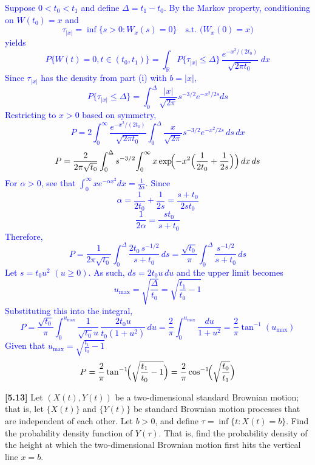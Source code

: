 \documentclass{article}
\begin{document}
\begin{enumerate}
        \textcolor{blue}{
Suppose $0<t_0<t_1$ and define $\Delta=t_1-t_0$. By the Markov property, conditioning on $W(t_0)=x$ and 
$$
\tau_{|x|}=\inf\{s>0:W_{x}(s)=0\}\quad\text{s.t. }\bigl(W_{x}(0)=x\bigr)
$$
yields
$$
P\{W(t)=0, t\in(t_0,t_1)\}
  =\int_{\mathbb R}P\{\tau_{|x|}\le\Delta\}\,
           \frac{e^{-x^{2}/(2t_0)}}{\sqrt{2\pi t_0}}\;dx
$$
Since $\tau_{|x|}$ has the density from part (i) with $b=|x|$,
$$
P\{\tau_{|x|}\le\Delta\}=\int_{0}^{\Delta}\frac{|x|}{\sqrt{2\pi}}s^{-3/2}
e^{-x^{2}/2s}ds
$$
Restricting to $x>0$ based on symmetry,
$$
P = 2\int_{0}^{\infty}\frac{e^{-x^{2}/(2t_0)}}{\sqrt{2\pi t_0}}
         \int_{0}^{\Delta}\frac{x}{\sqrt{2\pi}}s^{-3/2}
               e^{-x^{2}/2s}\,ds\,dx
$$
$$
P=\frac{2}{2\pi\sqrt{t_0}}
    \int_{0}^{\Delta}s^{-3/2}\!
      \int_{0}^{\infty}x\exp\!\Bigl(-x^{2}\Bigl(\frac1{2t_0}+\frac1{2s}\Bigr)\Bigr)\,dx\,ds
$$
For $\alpha>0$, see that $\int_{0}^{\infty}x e^{-\alpha x^{2}}dx=\frac1{2\alpha}$.
Since
$$
\alpha=\frac1{2t_0}+\frac1{2s}=\frac{s+t_0}{2st_0}
$$
$$
\frac1{2\alpha}=\frac{st_0}{s+t_0}
$$
Therefore,  
$$
P=\frac1{2\pi\sqrt{t_0}}
      \int_{0}^{\Delta}\frac{2t_0\,s^{-1/2}}{s+t_0}\,ds
  =\frac{\sqrt{t_0}}{\pi}\int_{0}^{\Delta}\!\frac{s^{-1/2}}{s+t_0}\,ds 
$$
Let $s=t_0u^{2}$ $(u\ge0)$. As such, $ds=2t_0u\,du$ and the upper limit becomes  
$$
u_{\max}=\sqrt{\frac{\Delta}{t_0}}=\sqrt{\frac{t_1}{t_0}-1}
$$
Substituting this into the integral,
$$
P=\frac{\sqrt{t_0}}{\pi}\int_{0}^{u_{\max}}
       \frac{1}{\sqrt{t_0}u}\,\frac{2t_0u}{t_0(1+u^{2})}\,du
  =\frac{2}{\pi}\int_{0}^{u_{\max}}\frac{du}{1+u^{2}}
  =\frac{2}{\pi}\tan^{-1}(u_{\max})
$$
Given that 
$
u_{\max}=\sqrt{\frac{t_1}{t_0}-1}$
$$
P=\frac{2}{\pi}\tan^{-1}\!\Bigl(\sqrt{\frac{t_1}{t_0}-1}\Bigr)
  =\frac{2}{\pi}\cos^{-1}\!\Bigl(\sqrt{\frac{t_0}{t_1}}\Bigr)
$$
        }

\end{enumerate}



\textbf{[5.13]} Let $(X(t), Y(t))$ be a two-dimensional standard Brownian motion; that is, let $\{X(t)\}$ and $\{Y(t)\}$ be standard Brownian motion processes that are independent of each other. Let $b > 0$, and define $\tau = \inf\{t : X(t) = b\}$. Find the probability density function of $Y(\tau)$. That is, find the probability density of the height at which the two-dimensional Brownian motion first hits the vertical line $x = b$.
\end{document}
